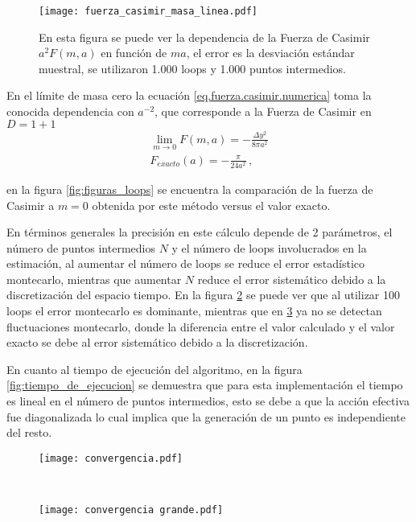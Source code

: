 \begin{figure}
    \centering
    \texttt{[image: fuerza\_casimir\_masa\_linea.pdf]}
    \caption{En esta figura se puede ver la dependencia de la Fuerza de Casimir $a^2 F(m,a)$ en función de $m a$, el error es la desviación estándar muestral, se utilizaron 1.000 loops y 1.000 puntos intermedios.}
    \label{fig:fuerza_Casimir_masa}
\end{figure}



En el límite de masa cero la ecuación \eqref{eq.fuerza.casimir.numerica}  toma la conocida dependencia con $a^{-2}$, que corresponde a la Fuerza de Casimir en $D = 1+1$
\begin{align}
\lim _{m \rightarrow 0} F(m,a) = - \frac{\Delta y^2}{8 \pi a^2} \\
F _{exacto} (a) = - \frac{\pi}{24 a^2}
\, ,
\end{align}

en la figura \ref{fig:figuras_loops} se encuentra la comparación de la fuerza de Casimir a $m=0$ obtenida por este método versus el valor exacto.





En términos generales la precisión en este cálculo depende de 2 parámetros, el número de puntos intermedios $N$ y el número de loops involucrados en la estimación, al aumentar el número de loops se reduce el error estadístico montecarlo, mientras que aumentar $N$ reduce el error sistemático debido a la discretización del espacio tiempo. En la figura \ref{fig:convergencia_loops} se puede ver que al utilizar  100 loops el error montecarlo es dominante, mientras que en \ref{fig:convergencia_loops.derecha} ya no se detectan fluctuaciones montecarlo, donde la diferencia entre el valor calculado y el valor exacto se debe al error sistemático debido a la discretización. 


En cuanto al tiempo de ejecución del algoritmo, en la figura \ref{fig:tiempo_de_ejecucion} se demuestra que para esta implementación  el tiempo es lineal en el número de puntos intermedios, esto se debe a que la acción efectiva fue diagonalizada lo cual implica que la generación de un punto es independiente del resto.



\begin{figure*}[t!]
    \centering
    \begin{subfigure}[t]{0.5\textwidth}
        \centering
        \texttt{[image: convergencia.pdf]}
        \caption{}
        \label{fig:convergencia_loops}
    \end{subfigure}%
    ~ 
    \begin{subfigure}[t]{0.5\textwidth}
        \centering
        \texttt{[image: convergencia grande.pdf]}
        \caption{}
        \label{fig:convergencia_loops.derecha}
    \end{subfigure}
    \caption{En esta figura se puede observar como al aumentar el número de loops y de puntos intermedios el resultado converge al valor teórico.}
\label{fig:figuras_loops}
\end{figure*}


